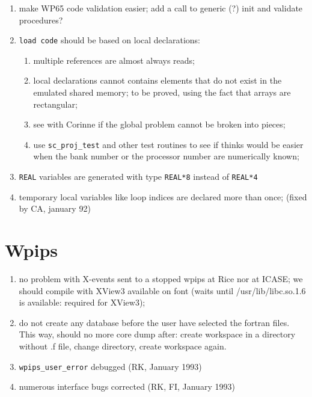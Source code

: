 \begin{enumerate}
  \item make WP65 code validation easier; add a call to generic (?) init
        and validate procedures?

  \item \verb+load code+ should be based on local declarations:

    \begin{enumerate}

        \item multiple references are almost always reads;

        \item local declarations cannot contains elements that
        do not exist in the emulated shared memory; to be proved,
        using the fact that arrays are rectangular;

        \item see with Corinne if the global problem cannot be broken
        into pieces;

        \item use \verb+sc_proj_test+ and other test routines to see
        if thinks would be easier when the bank number or the processor
        number are numerically known;

    \end{enumerate}

  \item {} 
        \verb+REAL+ variables are generated with type \verb+REAL*8+
        instead of \verb+REAL*4+

  \item {} temporary local variables like loop indices are declared
        more than once; (fixed by CA, january 92)

\end{enumerate}

\section{Wpips}

\begin{enumerate}

  \item no problem with X-events sent to a stopped wpips at Rice nor at
        ICASE; we should compile with XView3 available on font (waits
        until /usr/lib/libc.so.1.6 is available: required for XView3);

  \item do not create any database before the user have selected the
        fortran files. This way, should no more core dump after: create
        workspace in a directory without .f file, change directory,
        create workspace again.

  \item {\tt wpips\_user\_error} debugged (RK, January 1993)

  \item numerous interface bugs corrected (RK, FI, January 1993)

\end{enumerate}

